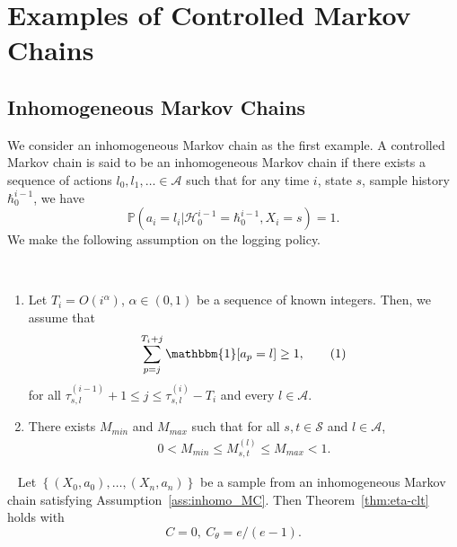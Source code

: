 \documentclass[twoside,11pt]{article}
\newcommand{\pow}[1]{^{(#1)}}%
\numberwithin{equation}{section}
\newcommand{\lp}{\left(}
\newcommand{\rp}{\right)}
\newcommand{\History}{\mathcal{H}}
\newcommand{\history}{\hbar}
\newcommand{\Pbb}{\mathbb{P}}
\newcommand{\indexeddata}{\left\{(X_0,a_0),\dots,(X_n,a_n)\right\}}
\newcommand\numberthis{\addtocounter{equation}{1}\tag{\theequation}}
\newcommand{\prob}{\Pbb}
\newcommand{\indicator}{\mathbbm{1}}
\begin{document}
\newpage

\appendix
\section{Examples of Controlled Markov Chains}
\subsection{Inhomogeneous Markov Chains}
\label{sec:inhomo-chain}
We consider an inhomogeneous Markov chain as the first example. 
A controlled Markov chain is said to be an inhomogeneous Markov chain if there exists a sequence of actions $l_0,l_1,\ldots \in \mathcal A$ such that for any time $i$, state $s$, sample history $\history_0^{i-1}$, we have
\[
\prob(a_i=l_i|\History_0^{i-1}=\history_0^{i-1},X_i=s)=1.
\]
We make the following assumption on the logging policy.
\begin{assumption}
\label{ass:inhomo_MC}\
\begin{enumerate}
    \item Let $T_i = O\lp i^\alpha\rp$, $\alpha \in (0,1)$ be a sequence of known integers. 
Then, we assume that
\begin{align*}
    \sum_{p=j}^{T_i+j} \indicator[a_p=l]\geq1,\numberthis\label{eq:inhomogenous-eq2}
 \end{align*}
for all $\tau_{s,l} \pow{i-1} + 1\leq j\leq \tau_{s,l} \pow i-T_i$ and every $l\in \mathcal A$.
    \item There exists $M_{min}$ and $M_{max}$ such that for all $s,t\in \mathcal{S}$ and $l\in\mathcal{A}$,
    \begin{align}
    0<M_{min}\leq M_{s,t}\pow l\leq M_{max}<1.   \label{eq:I2}     
    \end{align}
\end{enumerate}    
\end{assumption}
\begin{proposition}~\label{prop:inhomogenous-mc}
Let $\indexeddata$ be a sample from an inhomogeneous Markov chain satisfying Assumption~\ref{ass:inhomo_MC}. Then Theorem~\ref{thm:eta-clt} holds with
\[
C=0, \ C_{\theta}= e/(e-1).
\]
\end{proposition}
\end{document}
